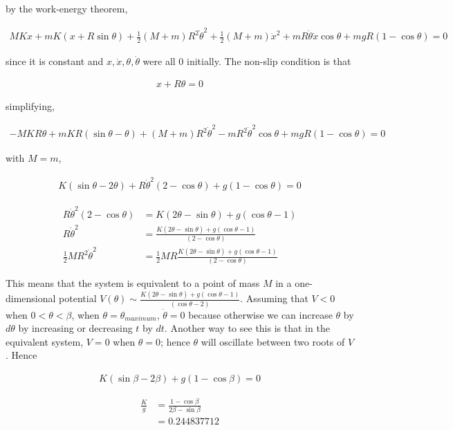 \documentclass{article}
\newcommand{\half}{\frac{1}{2}}
\begin{document}
by the work-energy theorem,

\begin{align*}
MKx + mK(x + R\sin\theta) + \half (M+m) R^2 \dot{\theta}^2 + \half (M+m) \dot{x}^2 + mR\dot\theta \dot x\cos\theta + mgR(1 - \cos\theta) = 0
\end{align*}

since it is constant and $x, \dot{x}, \theta, \dot{\theta}$ were all 0 initially. The non-slip condition is that

\begin{align*}
x + R\theta = 0
\end{align*}

simplifying,

\begin{align*}
-MKR\theta + mKR(\sin\theta - \theta) + (M+m) R^2 \dot{\theta}^2 - mR^2\dot\theta^2\cos\theta + mgR(1 - \cos\theta) = 0
\end{align*}

with $M=m$,

\begin{align*}
K(\sin\theta - 2\theta) + R \dot{\theta}^2 (2 - \cos\theta) + g(1 - \cos\theta) = 0
\end{align*}

\begin{align*}
R \dot{\theta}^2 (2 - \cos\theta) &= K(2\theta - \sin\theta)+ g(\cos\theta - 1) \\
R \dot{\theta}^2 &= \frac{K(2\theta - \sin\theta)+ g(\cos\theta - 1)}{(2 - \cos\theta)} \\
\half MR^2 \dot{\theta}^2 &= \half MR \frac{K(2\theta - \sin\theta)+ g(\cos\theta - 1)}{(2 - \cos\theta)}
\end{align*}

This means that the system is equivalent to a point of mass $M$ in a one-dimensional potential $V(\theta) \sim \frac{K(2\theta - \sin\theta)+ g(\cos\theta - 1)}{(\cos\theta - 2)}$. Assuming that $V < 0$ when $0 < \theta < \beta$, when $\theta = \theta_{maximum}$, $\dot\theta = 0$ because otherwise we can increase $\theta$ by $d\theta$ by increasing or decreasing $t$ by $dt$. Another way to see this is that in the equivalent system, $V = 0$ when $\theta = 0$; hence $\theta$ will oscillate between two roots of $V$. Hence

\begin{align*}
K(\sin\beta - 2\beta) + g(1 - \cos\beta) = 0
\end{align*}

\begin{align*}
\frac{K}{g} &= \frac{1 - \cos\beta}{2\beta - \sin\beta} \\
&= 0.244837712
\end{align*}
\end{document}
